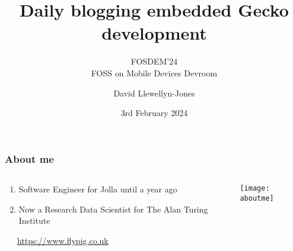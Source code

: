 \documentclass[
	notes=none,
	aspectratio=169
]{beamer}
\begin{document}
\title{Daily blogging embedded Gecko development}
\subtitle{FOSDEM'24\\FOSS on Mobile Devices Devroom}
\author{David Llewellyn-Jones}
\date{3rd February 2024}


\renewcommand{\thefootnote}{\arabic{footnote}}

\frame{
\titlepage
}
\note{
}

\renewcommand{\thefootnote}{\fnsymbol{footnote}}


\begin{frame}
\frametitle{About me}

\begin{columns}[T]
\begin{column}[T]{0.4\textwidth}
\setlength{\parskip}{0.5em}

\vspace{1.0cm}
\begin{enumerate}
\setlength{\parskip}{0.5em}
\item Software Engineer for Jolla until a year ago
\item Now a Research Data Scientist for The Alan Turing Institute
\end{enumerate}
\ \ \ \url{https://www.flypig.co.uk}

\end{column}
\begin{column}[T]{0.6\textwidth}
\setlength{\parskip}{0.5em}

\vspace{0.5cm}
\begin{center}
\texttt{[image: aboutme]}
\end{center}

\end{column}
\end{columns}

\end{frame}

\end{document}
